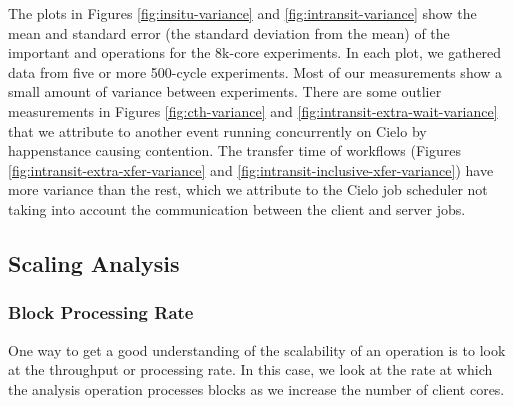 \begin{figure}[htbp]
\end{figure}


The plots in Figures \ref{fig:insitu-variance} and
\ref{fig:intransit-variance} show the mean and standard error (the standard
deviation from the mean) of the important \insitu and \intransit operations
for the 8k-core experiments.  In each plot, we gathered data from five or
more 500-cycle experiments.  Most of our measurements show a small amount
of variance between experiments.  There are some outlier measurements in
Figures \ref{fig:cth-variance} and \ref{fig:intransit-extra-wait-variance}
that we attribute to another event running concurrently on Cielo by
happenstance causing contention.  The transfer time of \intransit workflows
(Figures \ref{fig:intransit-extra-xfer-variance} and
\ref{fig:intransit-inclusive-xfer-variance}) have more variance than the
rest, which we attribute to the Cielo job scheduler not taking into account
the communication between the client and server jobs.


\FloatBarrier


\subsection{Scaling Analysis}
\label{sec:node-scaling}

\subsubsection{Block Processing Rate}

One way to get a good understanding of the scalability of an operation is
to look at the throughput or processing rate.  In this case, we look at the
rate at which the analysis operation processes blocks as we increase the
number of client cores.




